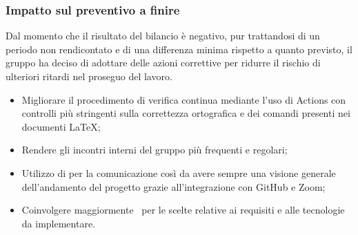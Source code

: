\subsubsection{Impatto sul preventivo a finire}
Dal momento che il risultato del bilancio è negativo, pur trattandosi di un periodo non rendicontato e di una differenza minima rispetto a quanto previsto, il gruppo {\Gruppo} ha deciso di adottare delle azioni correttive per ridurre il rischio di ulteriori ritardi nel proseguo del lavoro.
\begin{itemize}
	\item Migliorare il procedimento di verifica continua mediante l'uso di  Actions con controlli più stringenti sulla correttezza ortografica e dei comandi presenti nei documenti \LaTeX{};
	\item Rendere gli incontri interni del gruppo più frequenti e regolari;
	\item Utilizzo di  per la comunicazione così da avere sempre una visione generale dell'andamento del progetto grazie all'integrazione con GitHub e Zoom;
	\item Coinvolgere maggiormente \Proponente\ per le scelte relative ai requisiti e alle tecnologie da implementare.
\end{itemize}